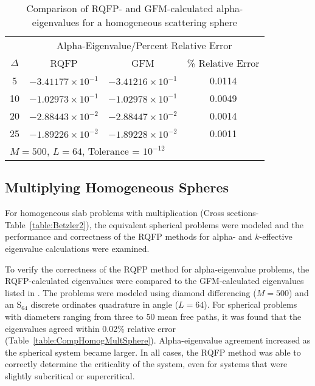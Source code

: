 \begin{table*}[!htbp]
\centering{}
\caption{Comparison of RQFP- and GFM-calculated alpha-eigenvalues for a homogeneous scattering sphere}
\label{table:CompHomogScattSphere}
\begin{tabular}{@{}cccc@{}}\toprule
& \multicolumn{3}{c}{Alpha-Eigenvalue/Percent Relative Error} \\
\cmidrule{2-4} $\Delta$ & RQFP & GFM & \% Relative Error \\
\midrule
5 & $-3.41177 \times 10^{-1}$ & $-3.41216 \times 10^{-1}$ & 0.0114 \\ 
10 & $-1.02973 \times 10^{-1}$ & $-1.02978 \times 10^{-1}$ & 0.0049 \\ 
20 & $-2.88443 \times 10^{-2}$ & $-2.88447 \times 10^{-2}$ & 0.0014 \\ 
25 & $-1.89226 \times 10^{-2}$ & $-1.89228 \times 10^{-2}$ & 0.0011 \\ 
\bottomrule
\multicolumn{4}{l}{$M = 500$, $L = 64$, Tolerance = $10^{-12}$} \\
\end{tabular}
\end{table*}

\subsection{Multiplying Homogeneous Spheres}

For homogeneous slab problems with multiplication (Cross sections-Table~\ref{table:Betzler2}), the equivalent spherical problems were modeled and the performance and correctness of the RQFP methods for alpha- and $k$-effective eigenvalue calculations were examined.

To verify the correctness of the RQFP method for alpha-eigenvalue problems, the RQFP-calculated eigenvalues were compared to the GFM-calculated eigenvalues listed in \cite{kornreich_greens_1997}. The problems were modeled using diamond differencing ($M=500$) and an S$_{64}$ discrete ordinates quadrature in angle ($L=64$). For spherical problems with diameters ranging from three to 50 mean free paths, it was found that the eigenvalues agreed within 0.02\% relative error (Table~\ref{table:CompHomogMultSphere}). Alpha-eigenvalue agreement increased as the spherical system became larger. In all cases, the RQFP method was able to correctly determine the criticality of the system, even for systems that were slightly subcritical or supercritical.

